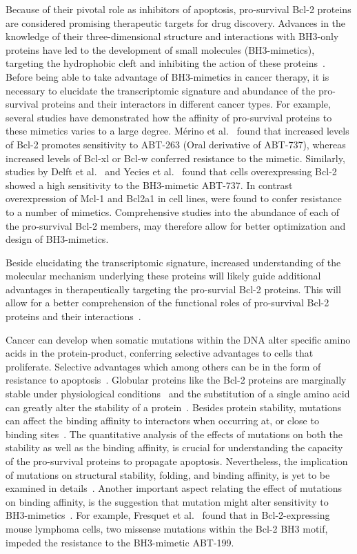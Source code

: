 \documentclass[10pt,letterpaper]{article}
\begin{document}
Because of their pivotal role as inhibitors of apoptosis, pro-survival Bcl-2 proteins are considered promising therapeutic targets for drug discovery. Advances in the knowledge of their three-dimensional structure and interactions with BH3-only proteins have led to the development of small molecules (BH3-mimetics), targeting the hydrophobic cleft and inhibiting the action of these proteins~\cite{Garner2017}.
Before being able to take advantage of BH3-mimetics in cancer therapy, it is necessary to elucidate the transcriptomic signature and abundance of the pro-survival proteins and their interactors in different cancer types. For example, several studies have demonstrated how the affinity of pro-survival proteins to these mimetics varies to a large degree. Mérino et al.~\cite{Merino2012} found that increased levels of Bcl-2 promotes sensitivity to ABT-263 (Oral derivative of ABT-737), whereas increased levels of Bcl-xl or Bcl-w conferred resistance to the mimetic. Similarly, studies by Delft et al.~\cite{VanDelft2006} and Yecies et al.~\cite{Yecies2010} found that cells overexpressing Bcl-2 showed a high sensitivity to the BH3-mimetic ABT-737. In contrast overexpression of Mcl-1 and Bcl2a1 in cell lines, were found to confer resistance to a number of mimetics. Comprehensive studies into the abundance of each of the pro-survival Bcl-2 members, may therefore allow for better optimization and design of BH3-mimetics.

Beside elucidating the transcriptomic signature, increased understanding of the molecular mechanism underlying these proteins will likely guide additional advantages in therapeutically targeting the pro-survial Bcl-2 proteins. This will allow for a better comprehension of the functional roles of pro-survival Bcl-2 proteins and their interactions~\cite{Czabotar2014}.

Cancer can develop when somatic mutations within the DNA alter specific amino acids in the protein-product, conferring selective advantages to cells that proliferate. Selective advantages which among others can be in the form of resistance to apoptosis~\cite{Hanahan2011}. Globular proteins like the Bcl-2 proteins are marginally stable under physiological conditions~\cite{Branden1999} and the substitution of a single amino acid can greatly alter the stability of a protein~\cite{Tokuriki2007}. Besides protein stability, mutations can affect the binding affinity to interactors when occurring at, or close to binding sites~\cite{Ferrer-Costa2002, Steward2003}. 
The quantitative analysis of the effects of mutations on both the stability as well as the binding affinity, is crucial for understanding the capacity of the pro-survival proteins to propagate apoptosis. Nevertheless, the implication of mutations on structural stability, folding, and binding affinity, is yet to be examined in details~\cite{Singh2016}. Another important aspect relating the effect of mutations on binding affinity, is the suggestion that mutation might alter sensitivity to BH3-mimetics~\cite{Letai2002,Singh2016}. For example, Fresquet et al.~\cite{Fresquet2014} found that in Bcl-2-expressing mouse lymphoma cells, two missense mutations within the Bcl-2 BH3 motif, impeded the resistance to the BH3-mimetic ABT-199.
\end{document}
